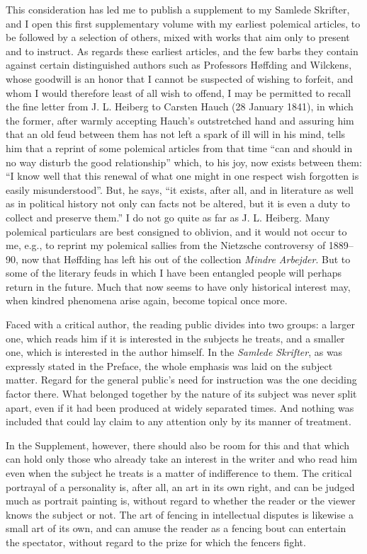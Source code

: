 \documentclass[12pt,a4paper,openany]{book}
\newcommand{\opage}[1]{\marginnote{\footnotesize\textit{[#1]}}}
\begin{document}
This consideration has led me to publish a supplement to my Samlede
Skrifter, and I open this first supplementary
\opage{2}volume with my earliest polemical articles, to be followed by a
selection of others, mixed with works that aim only to present and to
instruct. As regards these earliest articles, and the few barbs they
contain against certain distinguished authors such as Professors Høffding
and Wilckens, whose goodwill is an honor that I cannot be suspected of
wishing to forfeit, and whom I would therefore least of all wish to
offend, I may be permitted to recall the fine letter from J. L. Heiberg
to Carsten Hauch (28 January 1841), in which the former, after warmly
accepting Hauch's outstretched hand and assuring him that an old feud
between them has not left a spark of ill will in his mind, tells him that
a reprint of some polemical articles from that time ``can and should in
no way disturb the good relationship'' which, to his joy, now exists
between them: ``I know well that this renewal of what one might in one
respect wish forgotten is easily misunderstood''. But, he says, ``it
exists, after all, and in literature as well as in political history not
only can facts not be altered, but it is even a duty to collect and
preserve them.''
I do not go quite as far as J. L. Heiberg. Many polemical particulars are
best consigned to oblivion, and it would not occur to me, e.g., to
reprint my polemical sallies from the Nietzsche controversy of 1889--90,
now that Høffding has left his out of the collection \emph{Mindre Arbejder}.
But to some of the literary feuds in which I have been entangled people
will perhaps return in the future. Much that now seems to have only
historical interest may, when kindred phenomena arise again, become
topical once more.

Faced with a critical author, the reading public divides into two groups:
a larger one, which reads him if it is interested in the subjects he
treats, and a smaller one, which is interested in the author himself. In
the \emph{Samlede Skrifter}, as was expressly stated in the Preface, the
whole emphasis was laid on the subject matter.
\opage{3}Regard for the general public's need for instruction was the
one deciding factor there. What belonged together by the nature of its
subject was never split apart, even if it had been produced at widely
separated times. And nothing was included that could lay claim to any
attention only by its manner of treatment.

In the Supplement, however, there should also be room for this and that
which can hold only those who already take an interest in the writer and
who read him even when the subject he treats is a matter of indifference
to them. The critical portrayal of a personality is, after all, an art in
its own right, and can be judged much as portrait painting is, without
regard to whether the reader or the viewer knows the subject or not. The
art of fencing in intellectual disputes is likewise a small art of its own,
and can amuse the reader as a fencing bout can entertain the spectator,
without regard to the prize for which the fencers fight.
\end{document}
